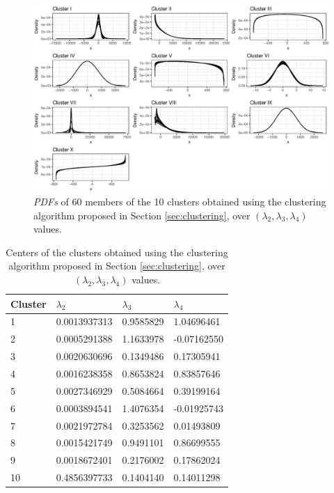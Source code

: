 \begin{figure}[ht]
    \centering
    \includegraphics[width=\textwidth]{img/use_cases/clusters.eps}
    \caption{\textit{PDFs} of 60 members of the 10 clusters obtained using the clustering algorithm proposed in Section \ref{sec:clustering}, over $(\lambda_{2}, \lambda_{3}, \lambda_{4})$ values.}
    \label{fig:cluster1}
\end{figure}

\begin{table}[H]
\begin{center}
    \begin{tabular}{|l|l|l|l|}
    \hline
    \textbf{Cluster} & $\lambda_{2}$ & $\lambda_{3}$ & $\lambda_{4}$         \\ \hline
    1     & 0.0013937313 & 0.9585829 & 1.04696461              \\ \hline
    2     & 0.0005291388 & 1.1633978 & -0.07162550            \\ \hline
    3     & 0.0020630696 & 0.1349486 & 0.17305941            \\ \hline
    4     &  0.0016238358 & 0.8653824 & 0.83857646               \\ \hline
    5     & 0.0027346929 & 0.5084664 & 0.39199164                \\ \hline
    6     & 0.0003894541 & 1.4076354 & -0.01925743               \\ \hline
    7     & 0.0021972784 & 0.3253562 & 0.01493809                 \\ \hline
    8     & 0.0015421749 & 0.9491101 & 0.86699555                \\ \hline
    9     & 0.0018672401 & 0.2176002 & 0.17862024            \\ \hline
    10   & 0.4856397733 & 0.1404140 & 0.14011298             \\ \hline
    \end{tabular}
    \caption {Centers of the clusters obtained using the clustering algorithm proposed in Section \ref{sec:clustering}, over $(\lambda_{2}, \lambda_{3}, \lambda_{4})$ values.}
    \label{tab:center_of_the_clusters}
    \end{center}
\end{table}

